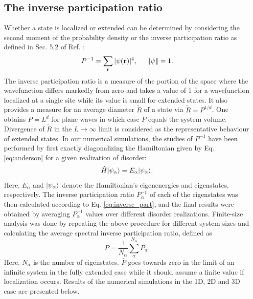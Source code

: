 \documentclass[10pt,a4paper]{article}
\begin{document}
\subsection{The inverse participation ratio}
\noindent Whether a state is localized or extended can be determined by considering the second moment of the probability density or the inverse participation ratio as defined in Sec. 5.2 of Ref. \cite{Kramer}:
\begin{equation}\label{eq:inverse_part}
P^{-1}=\sum\limits_\mathbf{r} |\psi(\textbf{r})|^4, \hspace{5mm} \left\Vert \psi \right\Vert=1.
\end{equation}
The inverse participation ratio is a measure of the portion of the space where the wavefunction differs markedly from zero and takes a value of $1$ for a wavefunction localized at a single site while its value is small for extended states. It also provides a measure for an average diameter $\tilde{R}$ of a state via $\tilde{R}=P^{1/d}$. One obtains $P=L^d$ for plane waves in which case $P$ equals the system volume. Divergence of $\tilde{R}$ in the $L\to\infty$ limit is considered as the representative behaviour of extended states. 
 In our numerical simulations, the studies of $P^{-1}$ have been performed by first exactly diagonalizing the Hamiltonian given by Eq. \eqref{eq:anderson} for a given realization of disorder:
\begin{equation}\label{eq:diagonalizacija}
\hat{H}\vert\psi_\alpha\rangle = E_\alpha\vert\psi_\alpha\rangle.
\end{equation}
Here, $E_\alpha$ and $\vert\psi_\alpha\rangle$ denote the Hamiltonian's eigenenergies and eigenstates, respectively. The inverse participation ratio $P^{-1}_\alpha$ of each of the eigenstates was then calculated according to Eq. \eqref{eq:inverse_part}, and the final results were obtained by averaging $P_\alpha^{-1}$ values over different disorder realizations. Finite-size analysis was done by repeating the above procedure for different system sizes and calculating the average spectral inverse participation ratio, defined as 
\begin{equation}\label{eq:P_ave}
\bar{P}=\frac{1}{N_\alpha}\sum\limits_\alpha^{N_\alpha} P_\alpha.
\end{equation}
Here, $N_\alpha$ is the number of eigenstates. $\bar{P}$ goes towards zero in the limit of an infinite system in the fully extended case while it should assume a finite value if localization occurs. Results of the numerical simulations in the 1D, 2D and 3D case are presented below. 
\end{document}
